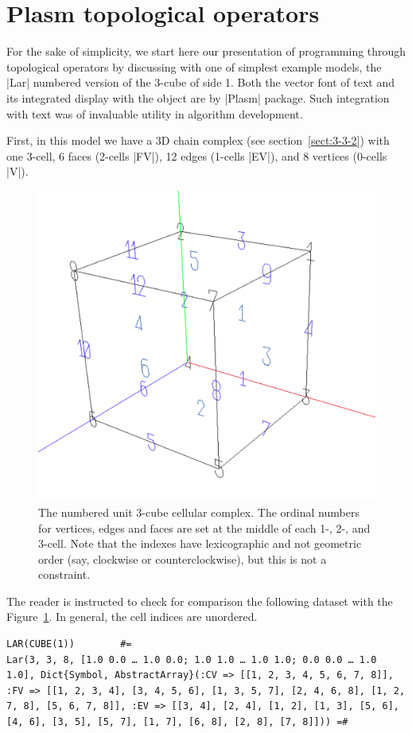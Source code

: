 \section{ Plasm topological operators}\label{sect:5-2}

For the sake of simplicity, we start here our presentation of programming through  topological operators by discussing with one of simplest example models, the |Lar| numbered version of the 3-cube of side 1. Both the vector font of text and its integrated display with the object are by |Plasm| package.  Such integration with text was of invaluable utility in algorithm development.

First, in this model we have a 3D chain complex (see section~\ref{sect:3-3-2}) with 
one 3-cell, 6 faces (2-cells |FV|), 12 edges (1-cells |EV|), and 8 vertices (0-cells |V|).

\begin{figure}[htbp] %
 \sidecaption[t]
 \includegraphics[width=0.5\linewidth]{chapter-05/figs/cube} 
 \caption{The numbered unit 3-cube cellular complex. 
 The ordinal numbers  for vertices, edges and faces are set at the middle of each 1-, 2-, and 3-cell. Note that the indexes have lexicographic and not geometric order (say, clockwise or counterclockwise), but this is not a constraint. }
 \label{fig:5:1:cube}
\end{figure}
The reader is instructed to check for comparison the following dataset with the Figure~\ref{fig:5:1:cube}. In general, the cell indices are unordered.
\begin{lstlisting}[language=JuliaLocal, style=julia, mathescape=true]
LAR(CUBE(1))		#=
Lar(3, 3, 8, [1.0 0.0 … 1.0 0.0; 1.0 1.0 … 1.0 1.0; 0.0 0.0 … 1.0 1.0], Dict{Symbol, AbstractArray}(:CV => [[1, 2, 3, 4, 5, 6, 7, 8]], :FV => [[1, 2, 3, 4], [3, 4, 5, 6], [1, 3, 5, 7], [2, 4, 6, 8], [1, 2, 7, 8], [5, 6, 7, 8]], :EV => [[3, 4], [2, 4], [1, 2], [1, 3], [5, 6], [4, 6], [3, 5], [5, 7], [1, 7], [6, 8], [2, 8], [7, 8]])) =#
\end{lstlisting}

